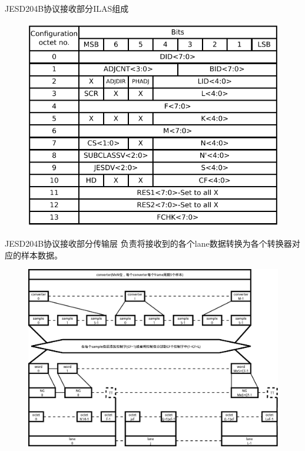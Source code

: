 \documentclass{beamer}
\begin{document}
\begin{frame}{JESD204B协议接收部分}{ILAS组成}
  \begin{figure}
  \includegraphics[scale=0.6]{./img/mapping_link_configuration_fields.pdf}
  \end{figure}
\end{frame}

\begin{frame}{JESD204B协议接收部分}{传输层}
  负责将接收到的各个lane数据转换为各个转换器对应的样本数据。
  \begin{figure}
	\centering
	\includegraphics[scale=0.3]{./img/user_data_format_for_multiple_lanes.pdf}
	\end{figure}
\end{frame}
\end{document}
